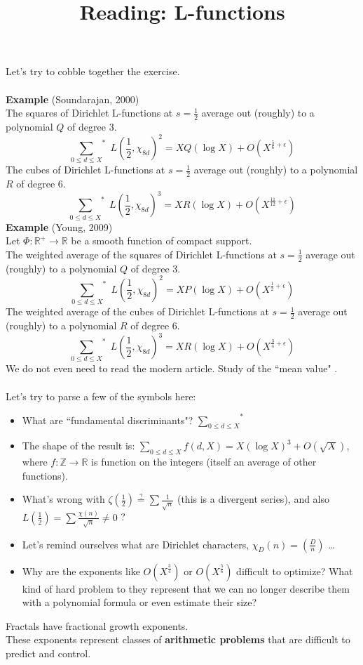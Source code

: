 \documentclass[12pt]{article}
\title{Reading: L-functions}
\date{}
\begin{document}
\sffamily

\maketitle

\noindent Let's try to cobble together the exercise.  \\ \\
\textbf{Example} (Soundarajan, 2000)\\  The squares of Dirichlet L-functions at $s = \frac{1}{2}$ average out (roughly) to a polynomial $Q$ of degree $3$.
$$ {\sum_{0 \leq d \leq X}}^* \; L(\frac{1}{2}, \chi_{8d})^2 = X Q(\log X) + O(X^{\frac{5}{6} + \epsilon}) $$
The cubes of Dirichlet L-functions at $s = \frac{1}{2}$ average out (roughly) to a polynomial $R$ of degree $6$.
$$ {\sum_{0 \leq d \leq X}}^* \; L(\frac{1}{2}, \chi_{8d})^3 = X R(\log X) + O(X^{\frac{11}{12} + \epsilon}) $$
\textbf{Example} (Young, 2009)\\  Let $\Phi: \mathbb{R}^+ \to \mathbb{R}$ be a smooth function of compact support.  \\ 
The weighted average of the  squares of Dirichlet L-functions at $s = \frac{1}{2}$ average out (roughly) to a polynomial $Q$ of degree $3$.
$$ {\sum_{0 \leq d \leq X}}^* \; L(\frac{1}{2}, \chi_{8d})^2 = X P(\log X) + O(X^{\frac{1}{2} + \epsilon}) $$
The weighted average of the cubes of Dirichlet L-functions at $s = \frac{1}{2}$ average out (roughly) to a polynomial $R$ of degree $6$.
$$ {\sum_{0 \leq d \leq X}}^* \; L(\frac{1}{2}, \chi_{8d})^3 = X R(\log X) + O(X^{\frac{3}{4} + \epsilon}) $$
We do not even need to read the modern article.  Study of the ``mean value" .\\ \\
Let's try to parse a few of the symbols here:
\begin{itemize}
\item What are ``fundamental discriminants"? $\displaystyle {\sum_{0 \leq d \leq X}}^*  $
\item The shape of the result is: $\sum_{0 \leq d \leq X} f(d, X) = X (\log X)^3 + O(\sqrt{X})$, where $f: \mathbb{Z} \to \mathbb{R}$ is  function on the integers (itself an average of other functions). 
\item What's wrong with $\zeta(\frac{1}{2}) \stackrel{?}{=} \sum \frac{1}{\sqrt{n}}$ (this is a divergent series), and also $L(\frac{1}{2}) = \sum \frac{\chi(n)}{\sqrt{n}} \neq 0$ ?
\item Let's remind ourselves what are Dirichlet characters, $\chi_D(n) = (\frac{D}{n})$ \dots
\item Why are the exponents like $O(X^\frac{3}{4})$ or $O(X^\frac{5}{6})$ difficult to optimize? What kind of hard problem to they represent that we can no longer describe them with a polynomial formula or even estimate their size?  
\end{itemize}
Fractals have fractional growth exponents.  \\ 
These exponents represent classes of \textbf{arithmetic problems} that are difficult to predict and control.
\end{document}
